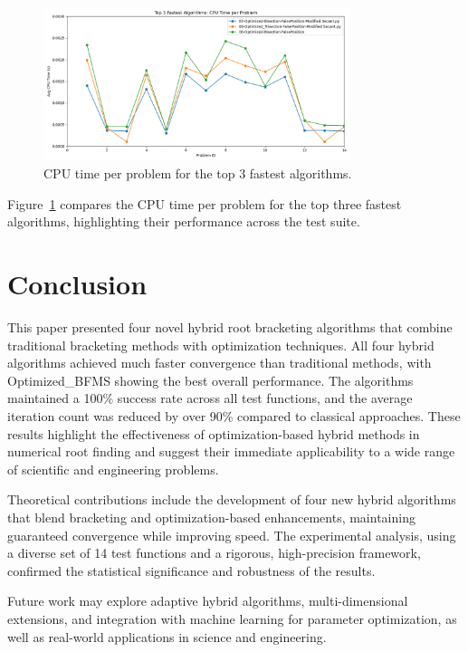 \documentclass[amsmath, amssymb, aps]{revtex4-2}
\begin{document}
\begin{figure}[H]
    \centering
    \includegraphics[width=0.8\textwidth]{top3_fastest_algorithms_lineplot.png}
    \caption{CPU time per problem for the top 3 fastest algorithms.}
    \label{fig:top3_fastest_algorithms}
\end{figure}

Figure~\ref{fig:top3_fastest_algorithms} compares the CPU time per problem for the top three fastest algorithms, highlighting their performance across the test suite.

\section{Conclusion}

This paper presented four novel hybrid root bracketing algorithms that combine traditional bracketing methods with optimization techniques. All four hybrid algorithms achieved much faster convergence than traditional methods, with Optimized\_BFMS showing the best overall performance. The algorithms maintained a 100\% success rate across all test functions, and the average iteration count was reduced by over 90\% compared to classical approaches. These results highlight the effectiveness of optimization-based hybrid methods in numerical root finding and suggest their immediate applicability to a wide range of scientific and engineering problems.

Theoretical contributions include the development of four new hybrid algorithms that blend bracketing and optimization-based enhancements, maintaining guaranteed convergence while improving speed. The experimental analysis, using a diverse set of 14 test functions and a rigorous, high-precision framework, confirmed the statistical significance and robustness of the results.

Future work may explore adaptive hybrid algorithms, multi-dimensional extensions, and integration with machine learning for parameter optimization, as well as real-world applications in science and engineering.
\end{document}
